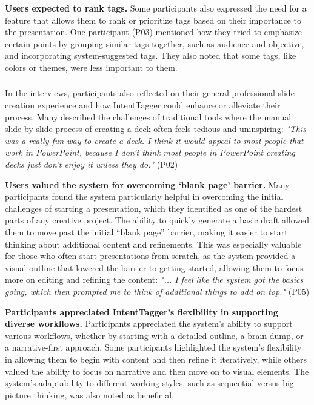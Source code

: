 \textbf{Users expected to rank tags. }
Some participants also expressed the need for a feature that allows them to rank or prioritize tags based on their importance to the presentation. One participant (P03) mentioned how they tried to emphasize certain points by grouping similar tags together, such as audience and objective, and incorporating system-suggested tags. They also noted that some tags, like colors or themes, were less important to them. 




\subsubsection{\textbf{}} \label{supporting-diverse-presentation-needs}

In the interviews, participants also reflected on their general professional slide-creation experience and how IntentTagger could enhance or alleviate their process. Many described the challenges of traditional tools where the manual slide-by-slide process of creating a deck often feels tedious and uninspiring: \textit{"This was a really fun way to create a deck. I think it would appeal to most people that work in PowerPoint, because I don't think most people in PowerPoint creating decks just don't enjoy it unless they do."} (P02) 




\textbf{Users valued the system for overcoming ‘blank page’ barrier.}
Many participants found the system particularly helpful in overcoming the initial challenges of starting a presentation, which they identified as one of the hardest parts of any creative project. The ability to quickly generate a basic draft allowed them to move past the initial “blank page” barrier, making it easier to start thinking about additional content and refinements. This was especially valuable for those who often start presentations from scratch, as the system provided a visual outline that lowered the barrier to getting started, allowing them to focus more on editing and refining the content: \textit{"... I feel like the system got the basics going, which then prompted me to think of additional things to add on top."} (P05)


\textbf{Participants appreciated IntentTagger's flexibility in supporting diverse workflows.}
Participants appreciated the system’s ability to support various workflows, whether by starting with a detailed outline, a brain dump, or a narrative-first approach. 
Some participants highlighted the system’s flexibility in allowing them to begin with content and then refine it iteratively, while others valued the ability to focus on narrative and then move on to visual elements. 
The system’s adaptability to different working styles, such as sequential versus big-picture thinking, was also noted as beneficial. 

